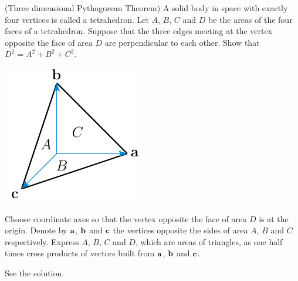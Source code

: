\begin{question}\label{prb pythagorous}
(Three dimensional Pythagorean Theorem) A solid body in space 
with exactly four vertices is called a tetrahedron. Let $A$, $B$, $C$ and
$D$ be the areas of the four faces of a tetrahedron. Suppose that the
three edges meeting at the vertex opposite the face of area $D$ are 
perpendicular to each other. Show that $D^2=A^2+B^2+C^2$.

\begin{center}
     \includegraphics{fig/tetrahedron.pdf}
\end{center}

\end{question}

\begin{hint}
Choose coordinate axes so that the vertex opposite
the face of area $D$ is at the origin. Denote  by $\mathbf{a}$, $\mathbf{b}$ and
$\mathbf{c}$ the vertices opposite the sides of area $A$, $B$ and $C$ respectively.
Express $A$, $B$, $C$ and $D$, which are areas of triangles, as one half 
times cross products of vectors built from $\mathbf{a}$, $\mathbf{b}$ and $\mathbf{c}$.
\end{hint}

\begin{answer}
See the solution.
\end{answer}

